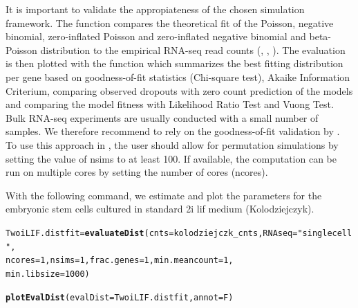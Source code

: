 \documentclass{article}\usepackage[]{graphicx}\usepackage[usenames,dvipsnames]{color}
\makeatletter
\newcommand{\hlnum}[1]{\textcolor[rgb]{0.686,0.059,0.569}{#1}}%
\newcommand{\hlstr}[1]{\textcolor[rgb]{0.192,0.494,0.8}{#1}}%
\newcommand{\hlstd}[1]{\textcolor[rgb]{0.345,0.345,0.345}{#1}}%
\newcommand{\hlkwb}[1]{\textcolor[rgb]{0.69,0.353,0.396}{#1}}%
\newcommand{\hlkwc}[1]{\textcolor[rgb]{0.333,0.667,0.333}{#1}}%
\newcommand{\hlkwd}[1]{\textcolor[rgb]{0.737,0.353,0.396}{\textbf{#1}}}%
\newenvironment{kframe}{%
 \def\at@end@of@kframe{}%
 \ifinner\ifhmode%
  \def\at@end@of@kframe{\end{minipage}}%
  \begin{minipage}{\columnwidth}%
 \fi\fi%
 \def\FrameCommand##1{\hskip\@totalleftmargin \hskip-\fboxsep
 \colorbox{shadecolor}{##1}\hskip-\fboxsep
     \hskip-\linewidth \hskip-\@totalleftmargin \hskip\columnwidth}%
 \MakeFramed {\advance\hsize-\width
   \@totalleftmargin\z@ \linewidth\hsize
   \@setminipage}}%
 {\par\unskip\endMakeFramed%
 \at@end@of@kframe}
\newenvironment{knitrout}{}{} %
\makeatother
\begin{document}
It is important to validate the appropiateness of the chosen simulation framework. The function  compares the theoretical fit of the Poisson, negative binomial, zero-inflated Poisson and zero-inflated negative binomial and beta-Poisson distribution to the empirical RNA-seq read counts (\cite{Colin_Cameron2013-vb}, \cite{Kim2013-qo}, \cite{Delmans2016-ef}).
The evaluation is then plotted with the function  which summarizes the best fitting distribution per gene based on goodness-of-fit statistics (Chi-square test), Akaike Information Criterium, comparing observed dropouts with zero count prediction of the models and comparing the model fitness with Likelihood Ratio Test and Vuong Test.
Bulk RNA-seq experiments are usually conducted with a small number of samples. We therefore recommend to rely on the goodness-of-fit validation by \cite{Mi2015-ri}. To use this approach in , the user should allow for permutation simulations by setting the value of nsims to at least 100. If available, the computation can be run on multiple cores by setting the number of cores (ncores).

With the following command, we estimate and plot the parameters for the embryonic stem cells cultured in standard 2i lif medium (Kolodziejczyk).

\begin{knitrout}
\color{fgcolor}\begin{kframe}
\begin{alltt}
\hlstd{TwoiLIF.distfit} \hlkwb{=} \hlkwd{evaluateDist}\hlstd{(}\hlkwc{cnts} \hlstd{= kolodziejczk_cnts,} \hlkwc{RNAseq} \hlstd{=} \hlstr{"singlecell"}\hlstd{,}
    \hlkwc{ncores} \hlstd{=} \hlnum{1}\hlstd{,} \hlkwc{nsims} \hlstd{=} \hlnum{1}\hlstd{,} \hlkwc{frac.genes} \hlstd{=} \hlnum{1}\hlstd{,} \hlkwc{min.meancount} \hlstd{=} \hlnum{1}\hlstd{,}
    \hlkwc{min.libsize} \hlstd{=} \hlnum{1000}\hlstd{)}

\hlkwd{plotEvalDist}\hlstd{(}\hlkwc{evalDist} \hlstd{= TwoiLIF.distfit,} \hlkwc{annot} \hlstd{= F)}
\end{alltt}
\end{kframe}
\end{knitrout}
\end{document}
